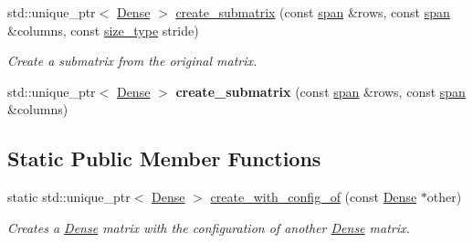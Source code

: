 \begin{DoxyCompactItemize}
std\+::unique\+\_\+ptr$<$ \hyperlink{classgko_1_1matrix_1_1Dense}{Dense} $>$ \hyperlink{classgko_1_1matrix_1_1Dense_ad606073cc426e9164bb2445354f22366}{create\+\_\+submatrix} (const \hyperlink{structgko_1_1span}{span} \&rows, const \hyperlink{structgko_1_1span}{span} \&columns, const \hyperlink{namespacegko_a6e5c95df0ae4e47aab2f604a22d98ee7}{size\+\_\+type} stride)
\begin{DoxyCompactList}\small\item\em Create a submatrix from the original matrix. \end{DoxyCompactList}\item 
\mbox{\label{classgko_1_1matrix_1_1Dense_a621650dbf619a21aafb8cc311dd14bc9}} 
std\+::unique\+\_\+ptr$<$ \hyperlink{classgko_1_1matrix_1_1Dense}{Dense} $>$ {\bfseries create\+\_\+submatrix} (const \hyperlink{structgko_1_1span}{span} \&rows, const \hyperlink{structgko_1_1span}{span} \&columns)
\end{DoxyCompactItemize}
\subsection*{Static Public Member Functions}
\begin{DoxyCompactItemize}
\item 
static std\+::unique\+\_\+ptr$<$ \hyperlink{classgko_1_1matrix_1_1Dense}{Dense} $>$ \hyperlink{classgko_1_1matrix_1_1Dense_a4c2089b9e1f7a99a32488a4964e832db}{create\+\_\+with\+\_\+config\+\_\+of} (const \hyperlink{classgko_1_1matrix_1_1Dense}{Dense} $\ast$other)
\begin{DoxyCompactList}\small\item\em Creates a \hyperlink{classgko_1_1matrix_1_1Dense}{Dense} matrix with the configuration of another \hyperlink{classgko_1_1matrix_1_1Dense}{Dense} matrix. \end{DoxyCompactList}\end{DoxyCompactItemize}
